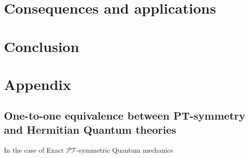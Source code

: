 \documentclass[12pt, a4paper]{report}
\newcommand\PT{\(\mathcal{PT}\)}
\begin{document}
\chapter{Consequences and applications}\label{Consq}







\chapter{Conclusion}\label{Conclusion}



\chapter{Appendix}\label{appendix}
\section{One-to-one equivalence between PT-symmetry and Hermitian Quantum theories}

In the case of Exact \PT-symmetric Quantum mechanics



\end{document}
